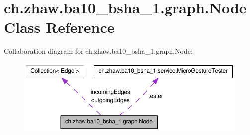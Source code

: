 \hypertarget{classch_1_1zhaw_1_1ba10__bsha__1_1_1graph_1_1Node}{
\section{ch.zhaw.ba10\_\-bsha\_\-1.graph.Node Class Reference}
\label{classch_1_1zhaw_1_1ba10__bsha__1_1_1graph_1_1Node}
}
Collaboration diagram for ch.zhaw.ba10\_\-bsha\_\-1.graph.Node:\nopagebreak
\begin{figure}[H]
\begin{center}
\leavevmode
\includegraphics[width=396pt]{classch_1_1zhaw_1_1ba10__bsha__1_1_1graph_1_1Node__coll__graph}
\end{center}
\end{figure}
